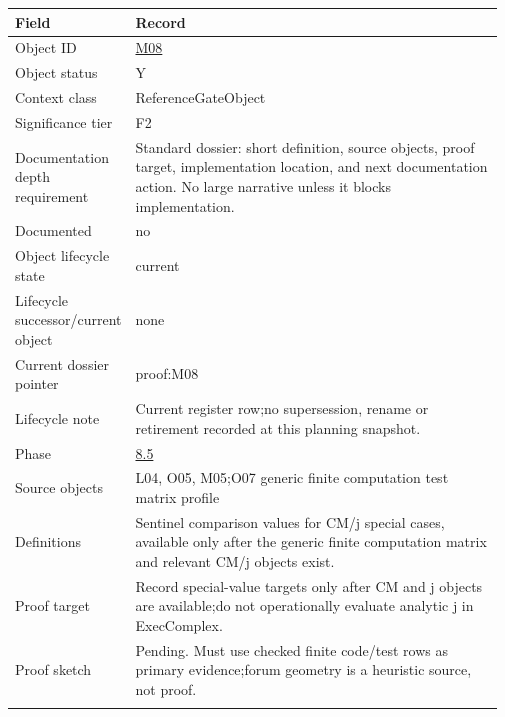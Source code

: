 \begin{longtable}{L{0.16\linewidth} L{0.81\linewidth}}
\hline
\textbf{Field} & \textbf{Record}\\
\hline
Object ID & \hyperlink{object-row-M08}{M08}\\
\hline\addlinespace[0.20em]
Object status & Y\\
\hline\addlinespace[0.20em]
Context class & ReferenceGateObject\\
\hline\addlinespace[0.20em]
Significance tier & F2\\
\hline\addlinespace[0.20em]
Documentation depth requirement & Standard dossier: short definition, source objects, proof target, implementation location, and next documentation action. No large narrative unless it blocks implementation.\\
\hline\addlinespace[0.20em]
Documented & no\\
\hline\addlinespace[0.20em]
Object lifecycle state & current\\
\hline\addlinespace[0.20em]
Lifecycle successor/\allowbreak{}current object & none\\
\hline\addlinespace[0.20em]
Current dossier pointer & proof:M08\\
\hline\addlinespace[0.20em]
Lifecycle note & Current register row;\newline no supersession, rename or retirement recorded at this planning snapshot.\\
\hline\addlinespace[0.20em]
Phase & \hyperlink{phase-row-8-5}{8.5}\\
\hline\addlinespace[0.20em]
Source objects & L04, O05, M05;\newline O07 generic finite computation test matrix profile\\
\hline\addlinespace[0.20em]
Definitions & Sentinel comparison values for CM/\allowbreak{}j special cases, available only after the generic finite computation matrix and relevant CM/\allowbreak{}j objects exist.\\
\hline\addlinespace[0.20em]
Proof target & Record special-value targets only after CM and j objects are available;\newline do not operationally evaluate analytic j in ExecComplex.\\
\hline\addlinespace[0.20em]
Proof sketch & Pending. Must use checked finite code/\allowbreak{}test rows as primary evidence;\newline forum geometry is a heuristic source, not proof.\\
\hline\addlinespace[0.20em]

\end{longtable}
